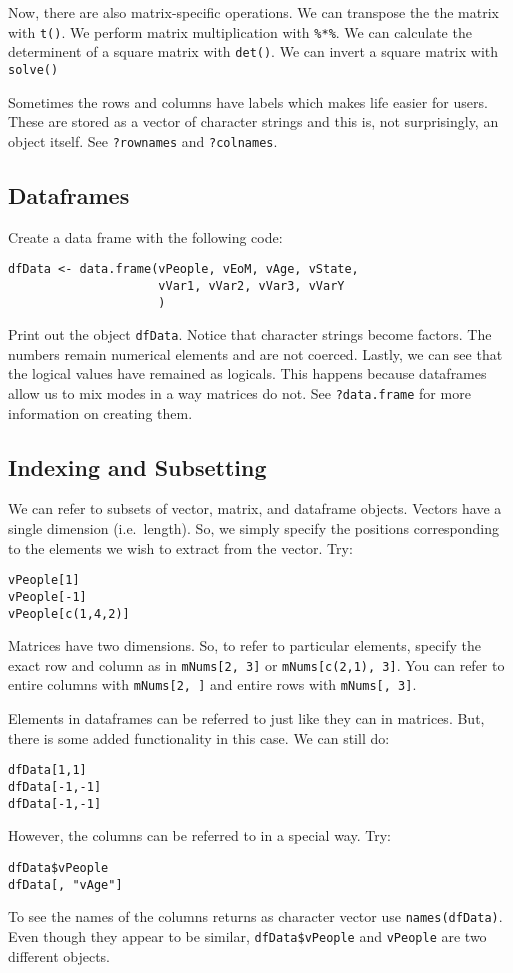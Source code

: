 Now, there are also matrix-specific operations. We can transpose the
the matrix with \texttt{t()}. We perform matrix multiplication with
\texttt{\%*\%}. We can calculate the determinent of a square matrix
with \texttt{det()}. We can invert a square matrix with \texttt{solve()}

Sometimes the rows and columns have labels which makes life easier for
users. These are stored as a vector of character strings and this is,
not surprisingly, an object itself. See \texttt{?rownames} and
\texttt{?colnames}.

\subsection{Dataframes}
Create a data frame with the following code:
\begin{verbatim}
dfData <- data.frame(vPeople, vEoM, vAge, vState, 
                     vVar1, vVar2, vVar3, vVarY
                     )
\end{verbatim}
Print out the object \texttt{dfData}. Notice that character strings
become factors. The numbers remain numerical elements and are not
coerced. Lastly, we can see that the logical values have remained as
logicals. This happens because dataframes allow us to mix modes in a
way matrices do not. See \texttt{?data.frame} for more information on
creating them.

\subsection{Indexing and Subsetting}
We can refer to subsets of vector, matrix, and dataframe
objects. Vectors have a single dimension (i.e.\ length). So, we simply
specify the positions corresponding to the elements we wish to extract
from the vector. Try:

\begin{verbatim}
vPeople[1]
vPeople[-1]
vPeople[c(1,4,2)]
\end{verbatim}

Matrices have two dimensions. So, to refer to particular elements,
specify the exact row and column as in \texttt{mNums[2, 3]} or
\texttt{mNums[c(2,1), 3]}. You can refer to entire columns with
\texttt{mNums[2, ]} and entire rows with \texttt{mNums[, 3]}.

Elements in dataframes can be referred to just like they can in
matrices. But, there is some added functionality in this case. We can
still do:
\begin{verbatim}
dfData[1,1]
dfData[-1,-1]
dfData[-1,-1]
\end{verbatim}
However, the columns can be referred to in a special way. Try:
\begin{verbatim}
dfData$vPeople
dfData[, "vAge"]
\end{verbatim}
To see the names of the columns returns as character vector use
\texttt{names(dfData)}. Even though they appear to be similar,
\texttt{dfData\$vPeople} and \texttt{vPeople} are two different
objects.

